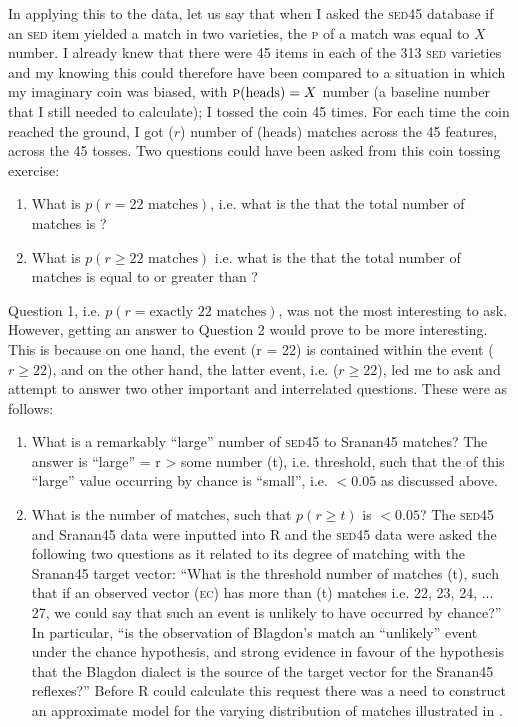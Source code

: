 In applying this to the data, let us say that when I asked the \textsc{sed45} database if an \textsc{sed} item yielded a match in two varieties, the  \textsc{p} of a match was equal to $X$ number. I already knew that there were 45 items in each of the 313 \textsc{sed} varieties and my knowing this could therefore have been compared to a situation in which my imaginary coin was biased, with $\textsc{p}(\text{heads}) = X$ number (a baseline number that I still needed to calculate); I tossed the coin 45 times. For each time the coin reached the ground, I got ($r$) number of (heads) matches across the 45 features, across the 45 tosses. Two questions could have been asked from this coin tossing exercise:

\begin{enumerate}
\item {What is $p(r = 22 \text{ matches})$, i.e. what is the  that the total number of matches is ?}
\item{What is $p(r \geq 22 \text{ matches})$ i.e. what is the  that the total number of matches is equal to or greater than ?}
\end{enumerate}

Question 1, i.e. $p(r = \text{exactly 22 matches})$, was not the most interesting to ask. However, getting an answer to Question 2 would prove to be more interesting. This is because on one hand, the event (r = 22) is contained within the event ($r\geq 22$), and on the other hand, the latter event, i.e. ($r \geq  22$), led me to ask and attempt to answer two other important and interrelated questions. These were as follows:

\begin{enumerate}
\item {What is a remarkably ``large'' number of \textsc{sed45} to Sranan45 matches? The answer is ``large'' = r > some number (t), i.e. threshold, such that the  of this ``large'' value occurring by chance is ``small'', i.e. $<0.05$ as discussed above.}
\item{What is the number of matches, such that $p(r \geq t)$ is $<0.05$? The \textsc{sed45} and Sranan45 data were inputted into R and the \textsc{sed45} data were asked the following two questions as it related to its degree of matching with the  Sranan45 target vector: ``What is the threshold number of matches (t), such that if an observed vector (\textsc{ec}) has more than (t) matches i.e. 22, 23, 24, ... 27, we could say that such an event is unlikely to have occurred by chance?'' In particular, ``is the observation of Blagdon's  match an ``unlikely'' event under the chance hypothesis, and strong evidence in favour of the hypothesis that the Blagdon dialect is the source of the target vector for the Sranan45 reflexes?'' Before R could calculate this request there was a need to construct an approximate model for the varying distribution of matches illustrated in .}
\end{enumerate}

